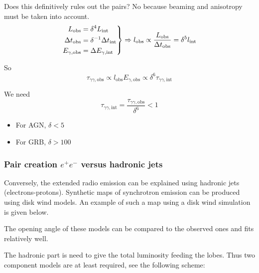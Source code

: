 \documentclass[10pt,a4paper,english]{article}
\let\originalleft\left
\let\originalright\right
\renewcommand{\left}{\mathopen{}\mathclose\bgroup\originalleft}
\renewcommand{\right}{\aftergroup\egroup\originalright}
\begin{document}
Does this definitively rules out the pairs? No because beaming and anisotropy
must be taken into account.
\begin{equation}
    \left.\begin{split}
        L_\mathrm{obs} & = \delta^4L_\mathrm{int} \\
        \Delta t_\mathrm{obs} & = \delta^{-1} \Delta t_\mathrm{int} \\
        E_{\gamma,\mathrm{obs}} & = \Delta E_{\gamma,\mathrm{int}}
    \end{split}\right\rbrace
    \Rightarrow l_\mathrm{obs} \propto \frac{L_\mathrm{obs}}{\Delta t_\mathrm{obs}} = \delta^5 l_\mathrm{int}
\end{equation}

So
\begin{equation}
    \tau_{\gamma\gamma,\mathrm{obs}} \propto l_\mathrm{obs} E_{\gamma,\mathrm{obs}} \propto \delta^6\tau_{\gamma\gamma,\mathrm{int}}
\end{equation}

We need
\begin{equation}
    \tau_{\gamma\gamma,\mathrm{int}} = \frac{\tau_{\gamma\gamma,\mathrm{obs}}}{\delta^6} < 1
\end{equation}
\begin{itemize}
    \item For AGN, $\delta < 5$
    \item For GRB, $\delta > 100$
\end{itemize}

\subsubsection{\texorpdfstring{Pair creation $e^+ e^-$ versus hadronic jets}{Pair creation e⁺e⁻ versus hadronic jets}}

Conversely, the extended radio emission can be explained using hadronic jets
(electrons-protons). Synthetic maps of synchrotron emission can be produced
using disk wind models. An example of such a map using a disk wind simulation
is given below.

The opening angle of these models can be compared to the observed ones and fits
relatively well.

The hadronic part is need to give the total luminosity feeding the lobes. Thus
two component models are at least required, see the following scheme:
\end{document}

